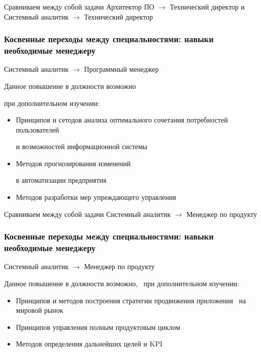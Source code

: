 \documentclass{../industrial-development}
\begin{document}
\lecturenotes
Сравниваем между собой задачи Архитектор ПО  $\rightarrow$ Технический директор  и
Системный аналитик $\rightarrow$ Технический директор


\begin{frame} \frametitle{Косвенные переходы между специальностями: навыки необходимые менеджеру}

\begin{block}{Системный аналитик $\rightarrow$ Программный менеджер}

Данное повышение в должности возможно 

при дополнительном изучении:
  \end{block}
\begin{itemize}
\item Принципов и сетодов анализа оптимального сочетания потребностей пользователей 

и возможностей информационной системы
\item Методов прогнозирования изменений 

в автоматизации предприятия
 \item Методов разработки мер упреждающего управления
\end{itemize}

\end{frame}

\lecturenotes

Сравниваем между собой задачи Системный аналитик $\rightarrow$ Менеджер по продукту 

\begin{frame} \frametitle{Косвенные переходы между специальностями: навыки необходимые менеджеру}

\begin{block}{Системный аналитик $\rightarrow$ Менеджер по продукту  }

Данное повышение в должности возможно, ~при дополнительном изучении:
  \end{block}
\begin{itemize}
\item Принципов и методов построения стратегии продвижения приложения ~на мировой рынок
\item Принципов управления полным продуктовым циклом
\item Методов определения дальнейших целей и KPI
\end{itemize}

\end{frame}

\lecturenotes
\end{document}
